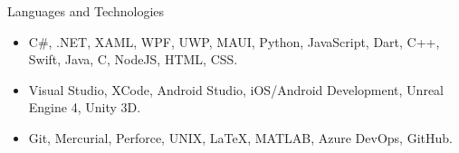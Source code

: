 \documentclass[]{mcdowellcv}
\begin{document}
	\begin{cvsection}{Languages and Technologies}
		\begin{cvsubsection}{}{}{}	
			\begin{itemize}
				\item C\#, .NET, XAML, WPF, UWP, MAUI, Python, JavaScript, Dart, C++, Swift, Java, C, NodeJS, HTML, CSS.
				\item Visual Studio, XCode, Android Studio, iOS/Android Development, Unreal Engine 4, Unity 3D.
				\item Git, Mercurial, Perforce, UNIX, LaTeX, MATLAB, Azure DevOps, GitHub.
			\end{itemize}
		\end{cvsubsection}
	\end{cvsection}
	
\end{document}
